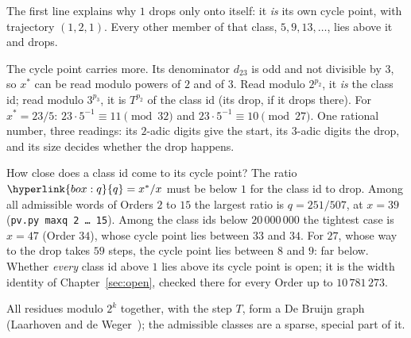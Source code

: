 \documentclass[11pt,a4paper,titlepage]{article}
\makeatletter
\newcommand{\termhere}[1]{\leavevmode
  \Hy@raisedlink{\hyper@anchorstart{term:#1}\hyper@anchorend}}
\newcommand{\keysym}[2]{\hyperlink{box:#1}{#2}}
\newcommand{\pv}[1]{\texttt{pv.py #1}}
\makeatother
\begin{document}
The first line explains why $1$ drops only onto itself: it \emph{is} its own
cycle point, with trajectory $(1, 2, 1)$. Every other member of that class,
$5, 9, 13, \dots$, lies above it and drops.

The cycle point carries more. Its denominator $d_{23}$ is odd and not divisible by
$3$, so $x^*$ can be read modulo powers of $2$ and of $3$. Read modulo $2^{p_2}$,
it \emph{is} the class id; read modulo $3^{p_3}$, it is $T^{p_2}$ of the class id (its drop, if it drops there). For
$x^* = 23/5$: $23 \cdot 5^{-1} \equiv 11 \pmod{32}$ and
$23 \cdot 5^{-1} \equiv 10 \pmod{27}$. One rational number, three readings:
its $2$-adic digits give the start, its $3$-adic digits the drop, and its size
decides whether the drop happens.

\termhere{q}How close does a class id come to its cycle point? The ratio $\keysym{q}{q} = x^*/x$ must
be below $1$ for the class id to drop. Among all admissible words of
Orders $2$ to $15$ the largest ratio is $q = 251/507$, at $x = 39$
(\pv{maxq 2 \dots\ 15}). Among the class ids below $20\,000\,000$ the tightest case is $x = 47$ (Order $34$), whose
cycle point lies between $33$ and $34$. For $27$, whose way to the
drop takes $59$ steps, the cycle point lies between $8$ and $9$: far below.
Whether \emph{every} class id above $1$ lies above its cycle point is open; it is the
width identity of Chapter~\ref{sec:open}, checked there for every Order up to
$10\,781\,273$.

\nopagebreak
All residues modulo $2^k$ together, with the step $T$, form a De Bruijn graph
(Laarhoven and de Weger~\cite{deWeger2012}); the admissible classes are a sparse,
special part of it.
\end{document}
